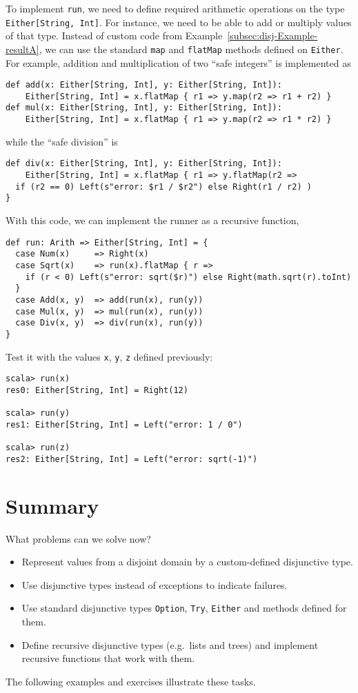To implement \lstinline!run!, we need to define required arithmetic
operations on the type \lstinline!Either[String, Int]!. For instance,
we need to be able to add or multiply values of that type. Instead
of custom code from Example~\ref{subsec:disj-Example-resultA}, we
can use the standard \lstinline!map! and \lstinline!flatMap! methods
defined on \lstinline!Either!. For example, addition and multiplication
of two \textsf{``}safe integers\textsf{''} is implemented as 
\begin{lstlisting}
def add(x: Either[String, Int], y: Either[String, Int]):
    Either[String, Int] = x.flatMap { r1 => y.map(r2 => r1 + r2) }
def mul(x: Either[String, Int], y: Either[String, Int]):
    Either[String, Int] = x.flatMap { r1 => y.map(r2 => r1 * r2) }
\end{lstlisting}
while the \textsf{``}safe division\textsf{''} is
\begin{lstlisting}
def div(x: Either[String, Int], y: Either[String, Int]):
    Either[String, Int] = x.flatMap { r1 => y.flatMap(r2 =>
  if (r2 == 0) Left(s"error: $r1 / $r2") else Right(r1 / r2) )
}
\end{lstlisting}
With this code, we can implement the runner as a recursive function,
\begin{lstlisting}
def run: Arith => Either[String, Int] = {
  case Num(x)     => Right(x)
  case Sqrt(x)    => run(x).flatMap { r =>
    if (r < 0) Left(s"error: sqrt($r)") else Right(math.sqrt(r).toInt)
  }
  case Add(x, y)  => add(run(x), run(y))
  case Mul(x, y)  => mul(run(x), run(y))
  case Div(x, y)  => div(run(x), run(y))
}
\end{lstlisting}
Test it with the values \lstinline!x!, \lstinline!y!, \lstinline!z!
defined previously:
\begin{lstlisting}
scala> run(x)
res0: Either[String, Int] = Right(12)

scala> run(y)
res1: Either[String, Int] = Left("error: 1 / 0")

scala> run(z)
res2: Either[String, Int] = Left("error: sqrt(-1)")
\end{lstlisting}


\section{Summary}

What problems can we solve now?
\begin{itemize}
\item Represent values from a disjoint domain by a custom-defined disjunctive
type.
\item Use disjunctive types instead of exceptions to indicate failures.
\item Use standard disjunctive types \lstinline!Option!, \lstinline!Try!,
\lstinline!Either! and methods defined for them.
\item Define recursive disjunctive types (e.g.~lists and trees) and implement
recursive functions that work with them.
\end{itemize}
The following examples and exercises illustrate these tasks.

